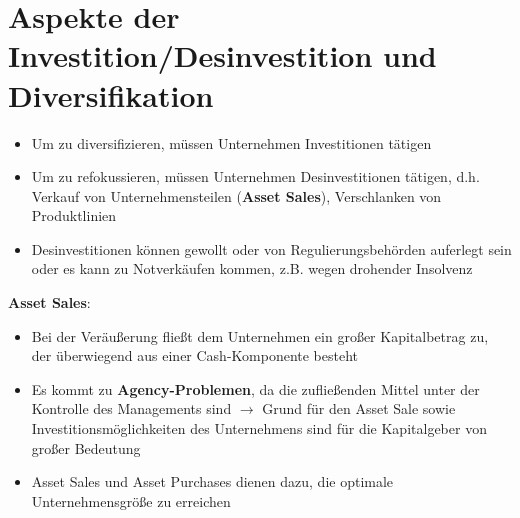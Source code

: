 \section{Aspekte der Investition/Desinvestition und Diversifikation}
\begin{itemize}
	\item Um zu diversifizieren, müssen Unternehmen Investitionen tätigen
	\item Um zu refokussieren, müssen Unternehmen Desinvestitionen tätigen, d.h. Verkauf von Unternehmensteilen (\textbf{Asset Sales}), Verschlanken von Produktlinien
	\item Desinvestitionen können gewollt oder von Regulierungsbehörden auferlegt sein oder es kann zu Notverkäufen kommen, z.B. wegen drohender Insolvenz
\end{itemize}
\bigskip
\textbf{Asset Sales}:
\begin{itemize}
	\item Bei der Veräußerung fließt dem Unternehmen ein großer Kapitalbetrag zu, der überwiegend aus einer Cash-Komponente besteht
	\item Es kommt zu \textbf{Agency-Problemen}, da die zufließenden Mittel unter der Kontrolle des Managements sind
	$\rightarrow$ Grund für den Asset Sale sowie Investitionsmöglichkeiten des Unternehmens sind für die Kapitalgeber von großer Bedeutung
	\item Asset Sales und Asset Purchases dienen dazu, die optimale Unternehmensgröße zu erreichen
\end{itemize}

